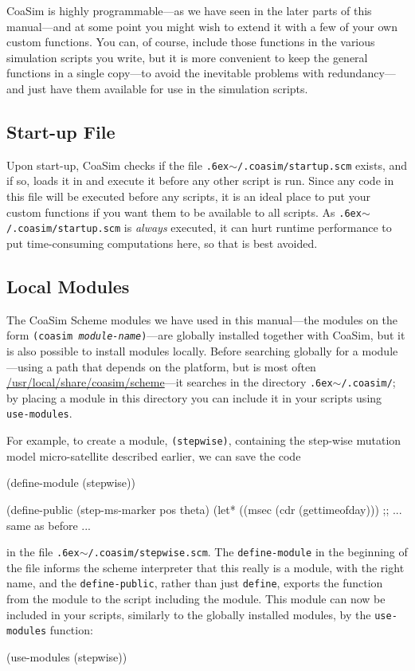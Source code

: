 \documentclass{manual}
\begin{document}
\begin{empfile}
CoaSim is highly programmable---as we have seen in the later parts of
this manual---and at some point you might wish to extend it with a few
of your own custom functions.  You can, of course, include those
functions in the various simulation scripts you write, but it is more
convenient to keep the general functions in a single copy---to avoid
the inevitable problems with redundancy---and just have them available
for use in the simulation scripts.


\subsection{Start-up File}
\label{sec:start-up-file}

Upon start-up, CoaSim checks if the file \texttt{\raise.6ex\hbox{$\scriptstyle\sim$}/.coasim/startup.scm}
exists, and if so, loads it in and execute it before any other script
is run.  Since any code in this file will be executed before any
scripts, it is an ideal place to put your custom functions if you want
them to be available to all scripts.  As \texttt{\raise.6ex\hbox{$\scriptstyle\sim$}/.coasim/startup.scm}
is \emph{always} executed, it can hurt runtime performance to put
time-consuming computations here, so that is best avoided.


\subsection{Local Modules}
\label{sec:local-modules}

The CoaSim Scheme modules we have used in this manual---the modules on
the form \texttt{(coasim \emph{module-name})}---are globally installed
together with CoaSim, but it is also possible to install modules
locally.  Before searching globally for a module---using a path that
depends on the platform, but is most often
\url{/usr/local/share/coasim/scheme}---it searches in the directory
\texttt{\raise.6ex\hbox{$\scriptstyle\sim$}/.coasim/}; by placing a
module in this directory you can include it in your scripts using
\texttt{use-modules}.

For example, to create a module, \texttt{(stepwise)}, containing the
step-wise mutation model micro-satellite described earlier, we can
save the code
\begin{code}
(define-module (stepwise))

(define-public (step-ms-marker pos theta)
  (let* ((msec (cdr (gettimeofday)))
  ;; ... same as before ...
\end{code}
in the file
\texttt{\raise.6ex\hbox{$\scriptstyle\sim$}/.coasim/stepwise.scm}.
The \texttt{define-module} in the beginning of the file informs the
scheme interpreter that this really is a module, with the right name,
and the \texttt{define-public}, rather than just \texttt{define},
exports the function from the module to the script including the
module.  This module can now be included in your scripts, similarly to
the globally installed modules, by the \texttt{use-modules} function:
\begin{code}
(use-modules (stepwise))
\end{code}


\end{empfile}
\end{document}
